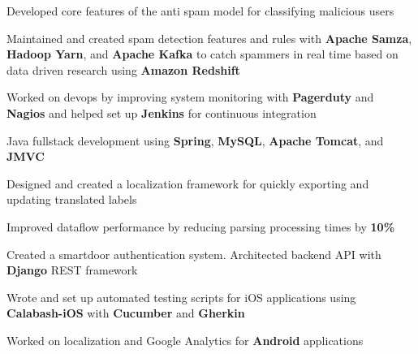 \documentclass[]{peter_resume}
\begin{document}
\begin{minipage}{\textwidth}
\begin{tightemize}
\item Developed core features of the anti spam model for classifying malicious users
\item Maintained and created spam detection features and rules with \textbf{Apache Samza}, \textbf{Hadoop Yarn}, and \textbf{Apache Kafka} to catch spammers in real time based on data driven research using \textbf{Amazon Redshift}
\item Worked on devops by improving system monitoring with \textbf{Pagerduty} and \textbf{Nagios} and helped set up \textbf{Jenkins} for continuous integration
\end{tightemize}
\sectionsep

\begin{tightemize}
\item Java fullstack development using \textbf{Spring}, \textbf{MySQL}, \textbf{Apache Tomcat}, and \textbf{JMVC}
\item Designed and created a localization framework for quickly exporting and updating translated labels
\item Improved dataflow performance by reducing parsing processing times by \textbf{10\%}
\end{tightemize}
\sectionsep

\begin{tightemize}
\item Created a smartdoor authentication system. Architected backend API with \textbf{Django} REST framework
\item Wrote and set up automated testing scripts for iOS applications using \textbf{Calabash-iOS} with \textbf{Cucumber} and \textbf{Gherkin}
\item Worked on localization and Google Analytics for \textbf{Android} applications
\end{tightemize}
\sectionsep


\begin{comment}
\runsubsection{Imagine Communications}
\descript{\hfill Application Developer}
\location{May 2014 – Aug 2014 | Waterloo, ON}
\begin{tightemize}
\item Developed an internal progress dashboard to record and monitor employee efficiency using \textbf{AngularJS} and \textbf{Bootstrap}
\item Worked on a \textbf{C\#} API for the progress dashboard
\item Maintained existing software systems by fixing bugs in the Silverlight frontend and \textbf{C\#} backend
\end{tightemize}
\sectionsep
\end{comment}


\end{minipage}
\end{document}
